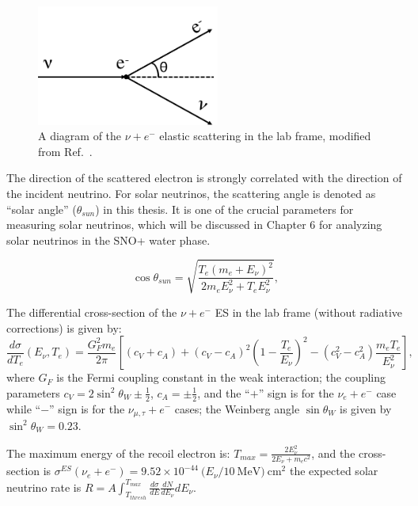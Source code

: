 \begin{figure}[htbp]
	\centering	
	\includegraphics[width=6cm]{ElasticScatteringCartoon.png}
	\caption{A diagram of the $\nu + e^-$ elastic scattering in the lab frame, modified from Ref.~\cite{giunti2007fundamentals}.	\label{fig:ESdiagram}}
\end{figure}

The direction of the scattered electron is strongly correlated with the direction of the incident neutrino. For solar neutrinos, the scattering angle is denoted as ``solar angle'' ($\theta_{sun}$) in this thesis. It is one of the crucial parameters for measuring solar neutrinos, which will be discussed in Chapter 6 for analyzing solar neutrinos in the SNO+ water phase.

\begin{equation}\label{eq:costhetaSun}
\cos\theta_{sun}=\sqrt{\frac{T_e(m_e+E_\nu)^2}{2m_eE_\nu^2+T_eE_\nu^2}},
\end{equation}

The differential cross-section of the $\nu+e^-$ ES in the lab frame (without radiative corrections) is given by\cite{suzuki2020sun,xing2011neutrinos,giunti2007fundamentals}:
\begin{equation}
\frac{d\sigma}{dT_e}(E_\nu,T_e)=\frac{G_F^2m_e}{2\pi}\left[(c_V+c_A)+(c_V-c_A)^2\left(1-\frac{T_e}{E_\nu}\right)^2-(c_V^2-c_A^2)\frac{m_eT_e}{E_\nu^2}\right],
\end{equation}
where $G_F$ is the Fermi coupling constant in the weak interaction; the coupling parameters $c_V=2\sin^2\theta_W\pm\frac{1}{2}$, $c_A=\pm\frac{1}{2}$, and the ``$+$'' sign is for the $\nu_e+e^-$ case while ``$-$'' sign is for the $\nu_{\mu,\tau}+e^-$ cases; the Weinberg angle $\sin\theta_W$ is given by $\sin^2\theta_W=0.23$.

The maximum energy of the recoil electron is: $T_{max}=\frac{2E^2_\nu}{2E_\nu+m_e c^2}$, and
the cross-section is $\sigma^{ES}(\nu_e +e^-)=9.52\times 10^{-44}~(E_\nu/10~\mathrm{MeV)~cm^2}$
the expected solar neutrino rate is 
$R=A\int_{T_{thresh}}^{T_{max}}\frac{d\sigma}{dE}\frac{dN}{dE_\nu}dE_\nu$\cite{suzuki2020sun}.
 
